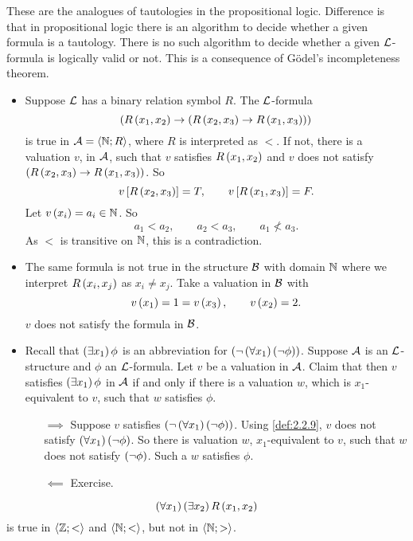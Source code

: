 These are the analogues of tautologies in the propositional logic. Difference is that in propositional logic there is an algorithm to decide whether a given formula is a tautology. There is no such algorithm to decide whether a given $ \LL $-formula is logically valid or not. This is a consequence of G\"odel's incompleteness theorem.

\begin{example}
\hfill
\begin{itemize}
\item Suppose $ \LL $ has a binary relation symbol $ R $. The $ \LL $-formula
$$ \impb{R\rb{x_1, x_2}}{\impb{R\rb{x_2, x_3}}{R\rb{x_1, x_3}}} $$
is true in $ \AA = \ab{\N; R} $, where $ R $ is interpreted as $ < $. If not, there is a valuation $ v $, in $ \AA $, such that $ v $ satisfies $ R\rb{x_1, x_2} $ and $ v $ does not satisfy $ \impb{R\rb{x_2, x_3}}{R\rb{x_1, x_3}} $. So
$$ v\sb{R\rb{x_2, x_3}} = T, \qquad v\sb{R\rb{x_1, x_3}} = F. $$
Let $ v\rb{x_i} = a_i \in \N $. So
$$ a_1 < a_2, \qquad a_2 < a_3, \qquad a_1 \not< a_3. $$
As $ < $ is transitive on $ \N $, this is a contradiction.
\item The same formula is not true in the structure $ \BB $ with domain $ \N $ where we interpret $ R\rb{x_i, x_j} $ as $ x_i \ne x_j $. Take a valuation in $ \BB $ with
$$ v\rb{x_1} = 1 = v\rb{x_3}, \qquad v\rb{x_2} = 2. $$
$ v $ does not satisfy the formula in $ \BB $.
\item Recall that $ \teb{x_1}\phi $ is an abbreviation for $ \notb{\fab{x_1}\notb{\phi}} $. Suppose $ \AA $ is an $ \LL $-structure and $ \phi $ an $ \LL $-formula. Let $ v $ be a valuation in $ \AA $. Claim that then $ v $ satisfies $ \teb{x_1}\phi $ in $ \AA $ if and only if there is a valuation $ w $, which is $ x_1 $-equivalent to $ v $, such that $ w $ satisfies $ \phi $.
\begin{itemize}
\item[$ \implies $] Suppose $ v $ satisfies $ \notb{\fab{x_1}\notb{\phi}} $. Using \ref{def:2.2.9}, $ v $ does not satisfy $ \fab{x_1}\notb{\phi} $. So there is valuation $ w $, $ x_1 $-equivalent to $ v $, such that $ w $ does not satisfy $ \notb{\phi} $. Such a $ w $ satisfies $ \phi $.
\item[$ \impliedby $] Exercise.
\end{itemize}
\end{itemize}
\end{example}

\begin{example}
$$ \fab{x_1}\teb{x_2}R\rb{x_1, x_2} $$
is true in $ \ab{\Z; <} $ and $ \ab{\N; <} $, but not in $ \ab{\N; >} $.
\end{example}

